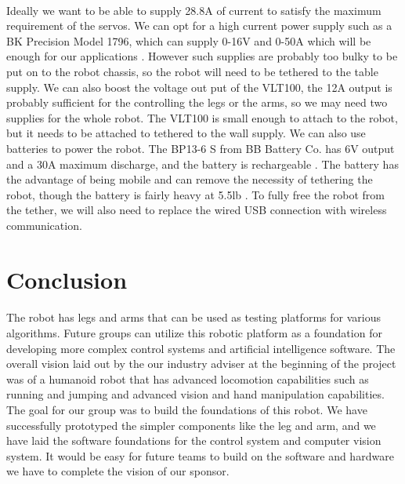 \documentclass[titlepage,letterpaper,12pt]{article}
\begin{document}
\paragraph{}Ideally we want to be able to supply 28.8A of current to
satisfy the maximum requirement of the servos. We can opt for a high current
power supply such as a BK Precision Model 1796, which can supply 0-16V and 0-50A
which will be enough for our applications \cite{bkpowerdata}. However such
supplies are probably too bulky to be put on to the robot chassis, so the robot
will need to be tethered to the table supply. We can also boost the voltage out
put of the VLT100, the 12A output is probably sufficient for the controlling the
legs or the arms, so we may need two supplies for the whole robot. The VLT100 is
small enough to attach to the robot, but it needs to be attached to tethered to
the wall supply. We can also use batteries to power the robot. The BP13-6 S from
BB Battery Co. has 6V output and a 30A maximum discharge, and the battery is
rechargeable \cite{batterydata}. The battery has the advantage of being mobile
and can remove the necessity of tethering the robot, though the battery is
fairly heavy at 5.5lb \cite{batterydata}. To fully free the robot from the
tether, we will also need to replace the wired USB connection with wireless
communication.

\section{Conclusion}
\paragraph{}The robot has legs and arms that can be used as testing
platforms for various algorithms. Future groups can utilize this robotic
platform as a foundation for developing more complex control systems and
artificial intelligence software. The overall vision laid out by the our
industry adviser at the beginning of the project was of a humanoid robot that
has advanced locomotion capabilities such as running and jumping and advanced
vision and hand manipulation capabilities. The goal for our group was to build
the foundations of this robot. We have successfully prototyped the simpler
components like the leg and arm, and we have laid the software foundations for
the control system and computer vision system. It would be easy for future teams
to build on the software and hardware we have to complete the vision of our
sponsor.
\end{document}
